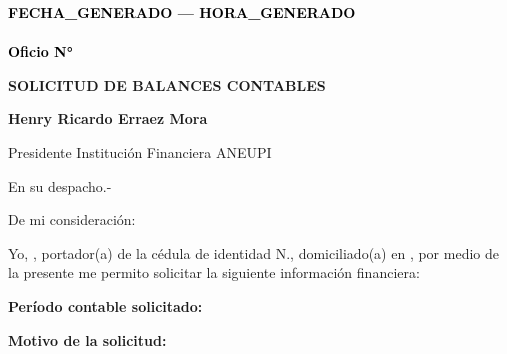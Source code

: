 \documentclass[a4paper,12pt]{article}
\begin{document}
\pagestyle{empty}

\vspace*{-5.5cm}
\begin{flushright}
{\footnotesize \textcolor{black}{\textbf{{{FECHA_GENERADO}} --- {{{HORA_GENERADO}}}}}} \\[-10pt] %
{\footnotesize \textcolor{black}{\underline{\hspace{7.5cm}}}} \\[-2pt] %
{\footnotesize \textcolor{black}{\textbf{Oficio N° }}} 
\end{flushright}

\vspace{2.5cm}
\noindent
\hspace*{\dimexpr\textwidth+1cm\relax}


\begin{center}
        \textbf{\large SOLICITUD DE BALANCES CONTABLES}
\end{center}

\vspace{0.8cm}

\noindent \textbf{Henry Ricardo Erraez Mora} 

\noindent Presidente Institución Financiera ANEUPI 

\noindent En su despacho.-

\vspace{1cm}

\noindent De mi consideración:

\noindent 
Yo, \textbf{\underline{\hspace{6cm}}}, portador(a) de la cédula de identidad N.\textbf{\underline{\hspace{4cm}}}, domiciliado(a) en \textbf{\underline{\hspace{8cm}}}, por medio de la presente me permito solicitar la siguiente información financiera:

\vspace{0.8cm}

\noindent
\textbf{Período contable solicitado:  } \textbf{\underline{\hspace{6cm}}}

\vspace{0.5cm}

\noindent
\textbf{Motivo de la solicitud:}

\vspace{0.5cm}

\noindent
\textbf{\underline{\hspace{16cm}}}
\end{document}
